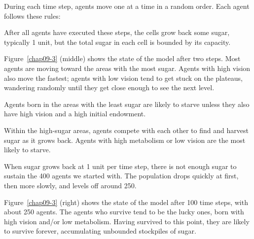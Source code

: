\documentclass[12pt]{book}
\theoremstyle{exercise}
\newcommand{\py}{\verb}%}
\begin{document}
During each time step, agents move one at a time in a random order.
Each agent follows these rules:


After all agents have executed these steps, the cells grow back
some sugar, typically 1 unit, but the total sugar in each cell is
bounded by its capacity.

Figure~\ref{chap09-3} (middle) shows the state of the model after two
steps.  Most agents are moving toward the areas with the most sugar.
Agents with high vision also move the fastest; agents with low vision
tend to get stuck on the plateaus, wandering randomly until they get
close enough to see the next level.

Agents born in the areas with the least sugar are likely to starve
unless they also have high vision and a high initial endowment.

Within the high-sugar areas, agents compete with each other to
find and harvest sugar as it grows back.  Agents with high metabolism
or low vision are the most likely to starve.

When sugar grows back at 1 unit per time step, there is not enough
sugar to sustain the 400 agents we started with.  The population
drops quickly at first, then more slowly, and levels off around 250.

Figure~\ref{chap09-3} (right) shows the state of the model after 100
time steps, with about 250 agents.  The agents who survive tend to
be the lucky ones, born with high vision and/or low metabolism.
Having survived to this point, they are likely to survive forever,
accumulating unbounded stockpiles of sugar.
\end{document}
